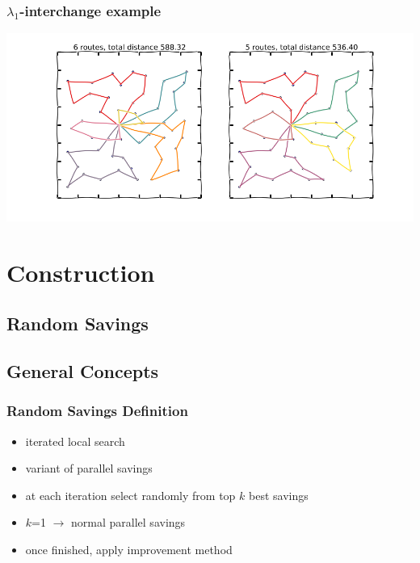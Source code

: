 \documentclass{beamer}
\begin{document}
\begin{frame}
\frametitle{$\lambda_1$-interchange example}
\begin{center}
\includegraphics[scale=0.3]{figs/lambda}

\end{center}
\end{frame}

\section{Construction}


\subsection{Random Savings}

\subsection{General Concepts}
\begin{frame}
\frametitle{Random Savings Definition}
\begin{itemize}
	\item iterated local search
	\item variant of parallel savings
	\item at each iteration select randomly from top $k$ best savings
	\item $k$=1 $\rightarrow$ normal parallel savings
	\item once finished, apply improvement method
		
\end{itemize}
\end{frame}
\end{document}
